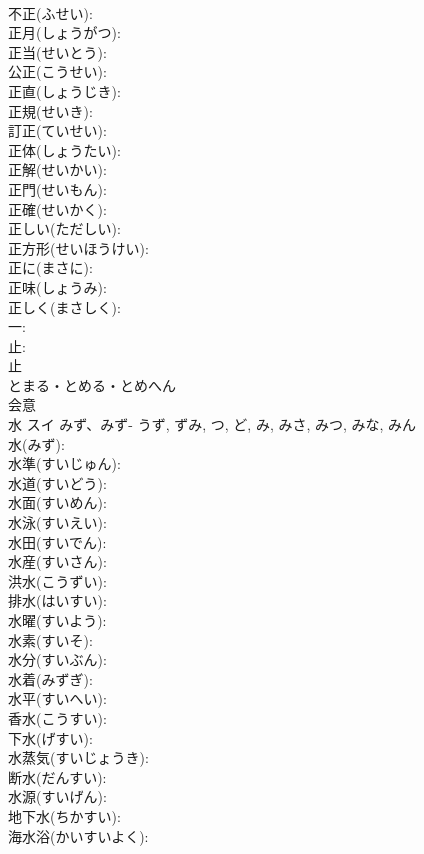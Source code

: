 \documentclass[8pt]{extreport}
\begin{document}
\begin{CJK}{UTF8}{min}
\\	不正(ふせい): 
\\	正月(しょうがつ): 
\\	正当(せいとう): 
\\	公正(こうせい): 
\\	正直(しょうじき): 
\\	正規(せいき): 
\\	訂正(ていせい): 
\\	正体(しょうたい): 
\\	正解(せいかい): 
\\	正門(せいもん): 
\\	正確(せいかく): 
\\	正しい(ただしい): 
\\	正方形(せいほうけい): 
\\	正に(まさに): 
\\	正味(しょうみ): 
\\	正しく(まさしく): 
\\	一: 
\\	止: 
\\	止	
\\	とまる・とめる・とめへん	
\\	会意 
\\	水	スイ	みず、みず-	うず, ずみ, つ, ど, み, みさ, みつ, みな, みん	
\\	水(みず): 
\\	水準(すいじゅん): 
\\	水道(すいどう): 
\\	水面(すいめん): 
\\	水泳(すいえい): 
\\	水田(すいでん): 
\\	水産(すいさん): 
\\	洪水(こうずい): 
\\	排水(はいすい): 
\\	水曜(すいよう): 
\\	水素(すいそ): 
\\	水分(すいぶん): 
\\	水着(みずぎ): 
\\	水平(すいへい): 
\\	香水(こうすい): 
\\	下水(げすい): 
\\	水蒸気(すいじょうき): 
\\	断水(だんすい): 
\\	水源(すいげん): 
\\	地下水(ちかすい): 
\\	海水浴(かいすいよく): 

\end{CJK}
\end{document}
